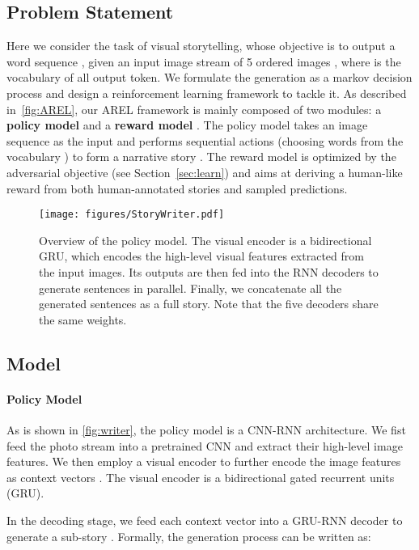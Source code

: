 \documentclass[11pt,a4paper]{article}
\begin{document}
\subsection{Problem Statement}
Here we consider the task of visual storytelling, whose objective is to output a word sequence ,  given an input image stream of 5 ordered images , where  is the vocabulary of all output token. We formulate the generation as a markov decision process and design a reinforcement learning framework to tackle it. As described in~\autoref{fig:AREL}, our AREL framework is mainly composed of two modules: a \textbf{policy model}  and a \textbf{reward model} . The policy model takes an image sequence  as the input and performs sequential actions (choosing words  from the vocabulary ) to form a narrative story . The reward model is optimized by the adversarial objective (see Section~\ref{sec:learn}) and aims at deriving a human-like reward from both human-annotated stories and sampled predictions.
\begin{figure}[!t]
\begin{center}
\texttt{[image: figures/StoryWriter.pdf]}  
\end{center}
\caption{Overview of the policy model. The visual encoder is a bidirectional GRU, which encodes the high-level visual features extracted from the input images. Its outputs are then fed into the RNN decoders to generate sentences in parallel. Finally, we concatenate all the generated sentences as a full story. Note that the five decoders share the same weights.}
\label{fig:writer}
\end{figure}

\subsection{Model}
\paragraph{Policy Model} As is shown in \autoref{fig:writer}, the policy model is a CNN-RNN architecture. We fist feed the photo stream  into a pretrained CNN and extract their high-level image features. We then employ a visual encoder to further encode the image features as context vectors . The visual encoder is a bidirectional gated recurrent units (GRU). 

In the decoding stage, we feed each context vector  into a GRU-RNN decoder to generate a sub-story . 
Formally, the generation process can be written as:
\end{document}
